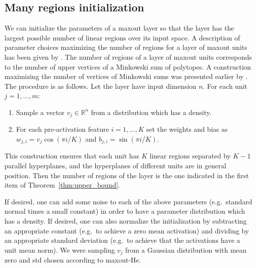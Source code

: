 \documentclass{article}
\theoremstyle{definition}
\begin{document}
  \subsection{Many regions initialization}
  We can initialize the parameters of a maxout layer so that the layer has the largest possible number of linear regions over its input space. 
  A description of parameter choices maximizing the number of regions for a layer of maxout units has been given by \citet[Proposition~3.4]{sharp2021}. The number of regions of a layer of maxout units corresponds to the number of upper vertices of a Minkowski sum of polytopes. A construction maximizing the number of vertices of Minkowski sums was presented earlier by \cite{Weibel12}. 
 The procedure is as follows. Let the layer have input dimension $n$. 
 For each unit $j=1,\ldots, m$:  
  \begin{enumerate}[leftmargin=*]
      \item Sample a vector $v_j\in\mathbb{R}^{n}$ from a distribution which has a density. 
      \item For each pre-activation feature $i=1,\ldots, K$ set the weights and bias as $w_{j,i} = v_j  \cos(\pi i/K)$ and $b_{j,i} = \sin(\pi i/K)$. 
  \end{enumerate} 
  This construction ensures that each unit has $K$ linear regions separated by $K-1$ parallel hyperplanes, and the hyperplanes of different units are in general position. Then the number of regions of the layer is the one indicated in the first item of Theorem~\ref{thm:upper_bound}. 
 
 If desired, one can add some noise to each of the above parameters (e.g.\ standard normal times a small constant) in order to have a parameter distribution which has a density. 
 If desired, one can also normalize the initialization by subtracting an appropriate constant (e.g.\ to achieve a zero mean activation) and dividing by an appropriate standard deviation (e.g.\ to achieve that the activations have a unit mean norm). 
We were sampling $v_j$ from a Gaussian distribution with mean zero and std chosen according to maxout-He.
  
\end{document}
